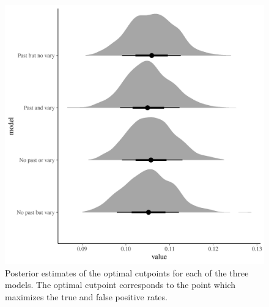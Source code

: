 \documentclass[12pt,letterpaper]{article}
\begin{document}
\begin{figure}[ht]
  \centering
  \includegraphics[width=\textwidth,height=0.5\textheight,keepaspectratio=true]{figure/cut_plot}
  \caption{Posterior estimates of the optimal cutpoints for each of the three models. The optimal cutpoint corresponds to the point which maximizes the true and false positive rates.}
  \label{fig:cut_point}
\end{figure}
\end{document}
